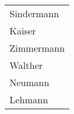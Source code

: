 \begin{enumerate}
\begin{center}
\begin{small}
            \tablehead{}
            \tabletail {
            }
            \begin{msoraclesql}
              \begin{supertabular}{l}
                Sindermann \\
                Kaiser \\
                Zimmermann \\
                Walther \\
                Neumann \\
                Lehmann \\
              \end{supertabular}
            \end{msoraclesql}
          \end{small}
        \end{center}
      \end{enumerate}
